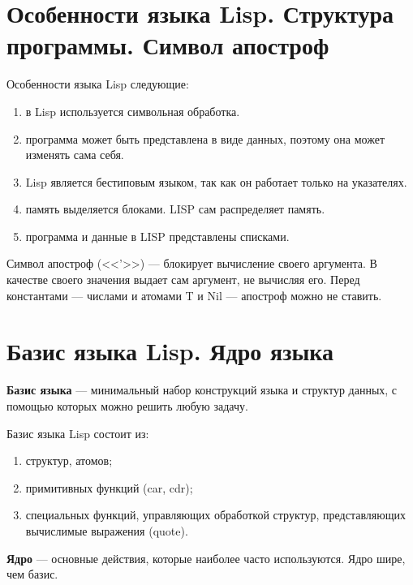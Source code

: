 \section{Особенности языка Lisp. Структура программы. Символ апостроф}

Особенности языка Lisp следующие:

\begin{enumerate} [label={\arabic*)}]
	\item в Lisp используется символьная обработка.
	\item программа может быть представлена в виде данных, поэтому она может изменять сама себя.
	\item Lisp является бестиповым языком, так как он работает только на указателях.
	\item память выделяется блоками. LISP сам распределяет память.
	\item программа и данные в LISP представлены списками.
\end{enumerate}

Символ апостроф (<<'>>) — блокирует вычисление своего аргумента. В качестве своего значения выдает сам аргумент, не вычисляя его. Перед константами --- числами и атомами T и Nil --- апостроф можно не ставить.

\section{Базис языка Lisp. Ядро языка}

\textbf{Базис языка} --- минимальный набор конструкций языка и структур данных, с помощью которых можно решить любую задачу.

Базис языка Lisp состоит из:

\begin{enumerate}[label={\arabic*)}]
	\item структур, атомов;
	\item примитивных функций (car, cdr);
	\item специальных функций, управляющих обработкой структур, представляющих вычислимые выражения (quote).
\end{enumerate}

\textbf{Ядро} --- основные действия, которые наиболее часто используются. Ядро шире, чем базис.
